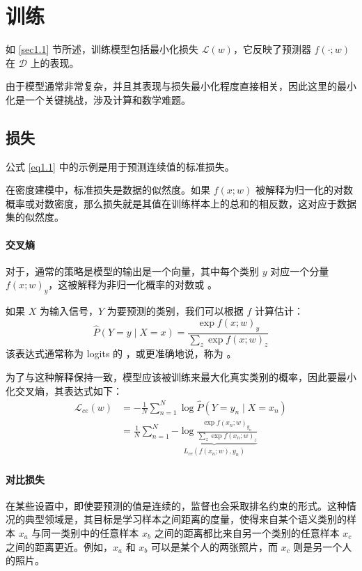 \chapter{训练}

如 \ref{sec1.1} 节所述，训练模型包括最小化损失 $\mathcal{L}(w)$，它反映了预测器 $f(\cdot;w)$ 在 $\mathcal{D}$ 上的表现。

由于模型通常非常复杂，并且其表现与损失最小化程度直接相关，因此这里的最小化是一个关键挑战，涉及计算和数学难题。

\section{损失}

公式 \ref{eq1.1} 中的示例是用于预测连续值的标准损失。

在密度建模中，标准损失是数据的似然度。如果 $f(x;w)$ 被解释为归一化的对数概率或对数密度，那么损失就是其值在训练样本上的总和的相反数，这对应于数据集的似然度。

\subsubsection*{交叉熵}

对于，通常的策略是模型的输出是一个向量，其中每个类别 $y$ 对应一个分量 $f(x;w)_y$，这被解释为非归一化概率的对数或 。

如果 $X$ 为输入信号，$Y$ 为要预测的类别，我们可以根据 $f$ 计算估计：
\[\hat{P}(Y=y \mid X=x) = \frac{\exp f(x;w)_y}{\sum_{z}\exp f(x;w)_z}\]
该表达式通常称为 logits 的 ，或更准确地说，称为 。

为了与这种解释保持一致，模型应该被训练来最大化真实类别的概率，因此要最小化交叉熵，其表达式如下：
\begin{align*}
    \mathcal{L}_{ce}(w) &= -\frac{1}{N}\sum_{n=1}^{N} \log \hat{P}(Y=y_n \mid X=x_n) \\
    &= \frac{1}{N}\sum_{n=1}^{N} \underbrace{-\log \frac{\exp f(x_n;w)_{y_n}}{\sum_{z}\exp f(x_n;w)_z}}_{L_{ce}(f(x_n;w),y_n)}
\end{align*}

\subsubsection*{对比损失}

在某些设置中，即使要预测的值是连续的，监督也会采取排名约束的形式。这种情况的典型领域是，其目标是学习样本之间距离的度量，使得来自某个语义类别的样本 $x_a$ 与同一类别中的任意样本 $x_b$ 之间的距离都比来自另一个类别的任意样本 $x_c$ 之间的距离更近。例如，$x_a$ 和 $x_b$ 可以是某个人的两张照片，而 $x_c$ 则是另一个人的照片。

